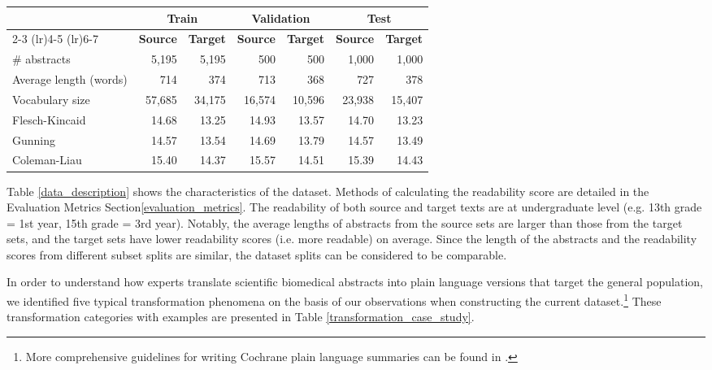 \documentclass[letterpaper, table]{article} %
\begin{document}
\begin{table*}
\centering
\begin{tabular}{@{} l rr rr rr @{}}
\toprule
& \multicolumn{2}{c}{\bf Train} & \multicolumn{2}{c}{\bf Validation} & \multicolumn{2}{c}{\bf Test} \\
\cmidrule(lr){2-3}
\cmidrule(lr){4-5}
\cmidrule(lr){6-7}
\multicolumn{1}{c}{}                           & \textbf{Source}       & \textbf{Target}
& \textbf{Source}       & \textbf{Target}
& \textbf{Source}       & \textbf{Target}      \\
\midrule
\# abstracts                              & 5,195        & 5,195       & 500            & 500            & 1,000       & 1,000       \\
Average length (words)                      & 714          & 374         & 713            & 368            & 727         & 378         \\
Vocabulary size                                  & 57,685       & 34,175       & 16,574         & 10,596         & 23,938      & 15,407      \\ \midrule
Flesch-Kincaid & 14.68 & 13.25 & 14.93 & 13.57 & 14.70 & 13.23\\
Gunning & 14.57 & 13.54 & 14.69 & 13.79 & 14.57 & 13.49\\
Coleman-Liau & 15.40 & 14.37 & 15.57 & 14.51 & 15.39 & 14.43 \\
\bottomrule

\end{tabular}
\caption{Dataset statistics across the different splits.}
\label{data_description}

\end{table*}


Table \ref{data_description} shows the characteristics of the dataset. Methods of calculating the readability score are detailed in the Evaluation Metrics Section\ref{evaluation_metrics}. The readability of both source and target texts are at undergraduate level (e.g. 13th grade = 1st year, 15th grade = 3rd year). Notably, the average lengths of abstracts from the source sets are larger than those from the target sets, and the target sets have lower readability scores (i.e. more readable) on average. Since the length of the abstracts and the readability scores from different subset splits are similar, the dataset splits can be considered to be comparable.



In order to understand how experts translate scientific biomedical abstracts into plain language versions that target the general population, we identified five typical transformation phenomena on the basis of our observations when constructing the current dataset.\footnote{More comprehensive guidelines for writing Cochrane plain language summaries can be found in \citet{mcilwain2014standards}.} These transformation categories with examples are presented in Table \ref{transformation_case_study}.
\end{document}
